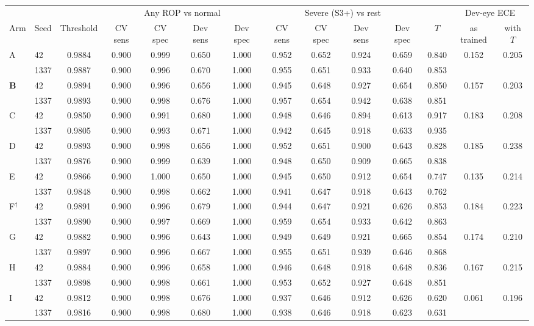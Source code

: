 \begin{tabular}{@{}llc@{\hspace{5pt}}cccc@{\hspace{5pt}}cccc@{\hspace{5pt}}ccc@{}}
\toprule
 & & & \multicolumn{4}{c}{Any ROP vs normal} & \multicolumn{4}{c}{Severe (S3+) vs rest} & & \multicolumn{2}{c}{Dev-eye ECE}\\
\cmidrule(lr){4-7}\cmidrule(lr){8-11}\cmidrule(l){13-14}
Arm & Seed & Threshold & CV sens & CV spec & Dev sens & Dev spec & CV sens & CV spec & Dev sens & Dev spec & $T$ & as trained & with $T$\\
\midrule
A & 42 & 0.9884 & 0.900 & 0.999 & 0.650 & 1.000 & 0.952 & 0.652 & 0.924 & 0.659 & 0.840 & 0.152 & 0.205 \\
 & 1337 & 0.9887 & 0.900 & 0.996 & 0.670 & 1.000 & 0.955 & 0.651 & 0.933 & 0.640 & 0.853 &  &  \\
\textbf{B} & 42 & 0.9894 & 0.900 & 0.996 & 0.656 & 1.000 & 0.945 & 0.648 & 0.927 & 0.654 & 0.850 & 0.157 & 0.203 \\
 & 1337 & 0.9893 & 0.900 & 0.998 & 0.676 & 1.000 & 0.957 & 0.654 & 0.942 & 0.638 & 0.851 &  &  \\
C & 42 & 0.9850 & 0.900 & 0.991 & 0.680 & 1.000 & 0.948 & 0.646 & 0.894 & 0.613 & 0.917 & 0.183 & 0.208 \\
 & 1337 & 0.9805 & 0.900 & 0.993 & 0.671 & 1.000 & 0.942 & 0.645 & 0.918 & 0.633 & 0.935 &  &  \\
D & 42 & 0.9893 & 0.900 & 0.998 & 0.656 & 1.000 & 0.952 & 0.651 & 0.900 & 0.643 & 0.828 & 0.185 & 0.238 \\
 & 1337 & 0.9876 & 0.900 & 0.999 & 0.639 & 1.000 & 0.948 & 0.650 & 0.909 & 0.665 & 0.838 &  &  \\
E & 42 & 0.9866 & 0.900 & 1.000 & 0.650 & 1.000 & 0.945 & 0.650 & 0.912 & 0.654 & 0.747 & 0.135 & 0.214 \\
 & 1337 & 0.9848 & 0.900 & 0.998 & 0.662 & 1.000 & 0.941 & 0.647 & 0.918 & 0.643 & 0.762 &  &  \\
F$^\dagger$ & 42 & 0.9891 & 0.900 & 0.996 & 0.679 & 1.000 & 0.944 & 0.647 & 0.921 & 0.626 & 0.853 & 0.184 & 0.223 \\
 & 1337 & 0.9890 & 0.900 & 0.997 & 0.669 & 1.000 & 0.959 & 0.654 & 0.933 & 0.642 & 0.863 &  &  \\
G & 42 & 0.9882 & 0.900 & 0.996 & 0.643 & 1.000 & 0.949 & 0.649 & 0.921 & 0.665 & 0.854 & 0.174 & 0.210 \\
 & 1337 & 0.9897 & 0.900 & 0.996 & 0.667 & 1.000 & 0.955 & 0.651 & 0.939 & 0.646 & 0.868 &  &  \\
H & 42 & 0.9884 & 0.900 & 0.996 & 0.658 & 1.000 & 0.946 & 0.648 & 0.918 & 0.648 & 0.836 & 0.167 & 0.215 \\
 & 1337 & 0.9898 & 0.900 & 0.998 & 0.661 & 1.000 & 0.953 & 0.652 & 0.927 & 0.648 & 0.851 &  &  \\
I & 42 & 0.9812 & 0.900 & 0.998 & 0.676 & 1.000 & 0.937 & 0.646 & 0.912 & 0.626 & 0.620 & 0.061 & 0.196 \\
 & 1337 & 0.9816 & 0.900 & 0.998 & 0.680 & 1.000 & 0.938 & 0.646 & 0.918 & 0.623 & 0.631 &  &  \\
\bottomrule
\end{tabular}
